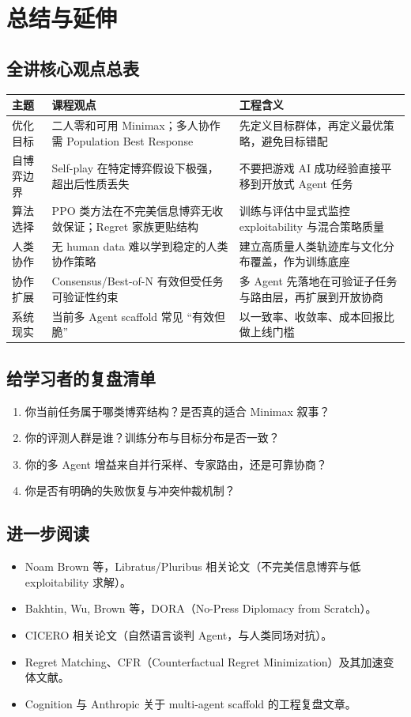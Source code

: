 \section{总结与延伸}

\subsection{全讲核心观点总表}
\begin{longtable}{p{2.8cm}p{4.7cm}p{5.8cm}}
\toprule
\textbf{主题} & \textbf{课程观点} & \textbf{工程含义} \\
\midrule
优化目标 & 二人零和可用 Minimax；多人协作需 Population Best Response & 先定义目标群体，再定义最优策略，避免目标错配 \\
自博弈边界 & Self-play 在特定博弈假设下极强，超出后性质丢失 & 不要把游戏 AI 成功经验直接平移到开放式 Agent 任务 \\
算法选择 & PPO 类方法在不完美信息博弈无收敛保证；Regret 家族更贴结构 & 训练与评估中显式监控 exploitability 与混合策略质量 \\
人类协作 & 无 human data 难以学到稳定的人类协作策略 & 建立高质量人类轨迹库与文化分布覆盖，作为训练底座 \\
协作扩展 & Consensus/Best-of-N 有效但受任务可验证性约束 & 多 Agent 先落地在可验证子任务与路由层，再扩展到开放协商 \\
系统现实 & 当前多 Agent scaffold 常见 ``有效但脆'' & 以一致率、收敛率、成本回报比做上线门槛 \\
\bottomrule
\end{longtable}

\subsection{给学习者的复盘清单}
\begin{enumerate}
    \item 你当前任务属于哪类博弈结构？是否真的适合 Minimax 叙事？
    \item 你的评测人群是谁？训练分布与目标分布是否一致？
    \item 你的多 Agent 增益来自并行采样、专家路由，还是可靠协商？
    \item 你是否有明确的失败恢复与冲突仲裁机制？
\end{enumerate}

\subsection{进一步阅读}
\begin{itemize}
    \item Noam Brown 等，Libratus/Pluribus 相关论文（不完美信息博弈与低 exploitability 求解）。
    \item Bakhtin, Wu, Brown 等，DORA（No-Press Diplomacy from Scratch）。
    \item CICERO 相关论文（自然语言谈判 Agent，与人类同场对抗）。
    \item Regret Matching、CFR（Counterfactual Regret Minimization）及其加速变体文献。
    \item Cognition 与 Anthropic 关于 multi-agent scaffold 的工程复盘文章。
\end{itemize}

